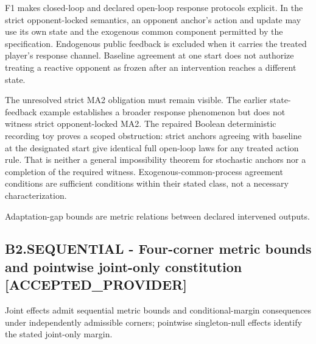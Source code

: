\documentclass[11pt,a4paper]{article}
\newcommand{\companionEquation}[1]{\begin{center}\sbox{\companionEqBox}{$\displaystyle #1$}\ifdim\wd\companionEqBox>\linewidth\resizebox{\linewidth}{!}{\usebox{\companionEqBox}}\else\usebox{\companionEqBox}\fi\end{center}}
\begin{document}
F1 makes closed-loop and declared open-loop response protocols explicit. In the strict opponent-locked semantics, an opponent anchor's action and update may use its own state and the exogenous common component permitted by the specification. Endogenous public feedback is excluded when it carries the treated player's response channel. Baseline agreement at one start does not authorize treating a reactive opponent as frozen after an intervention reaches a different state.

The unresolved strict MA2 obligation must remain visible. The earlier state-feedback example establishes a broader response phenomenon but does not witness strict opponent-locked MA2. The repaired Boolean deterministic recording toy proves a scoped obstruction: strict anchors agreeing with baseline at the designated start give identical full open-loop laws for any treated action rule. That is neither a general impossibility theorem for stochastic anchors nor a completion of the required witness. Exogenous-common-process agreement conditions are sufficient conditions within their stated class, not a necessary characterization.

\companionEquation{|\Delta_{\rm CL}(y)-\Delta_{\rm OL}(y)|\leq A(y)\leq\Delta_{\rm CL}(y)+\Delta_{\rm OL}(y).}
{\small Adaptation-gap bounds are metric relations between declared intervened outputs.}
\subsection*{B2.SEQUENTIAL - Four-corner metric bounds and pointwise joint-only constitution [ACCEPTED\_PROVIDER]}
Joint effects admit sequential metric bounds and conditional-margin consequences under independently admissible corners; pointwise singleton-null effects identify the stated joint-only margin.
\end{document}
